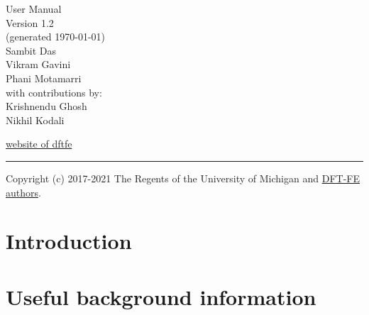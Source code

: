 \documentclass{article}
\begin{document}
{%
\color{dark_grey}
\vspace{1.0em}
\hfill{\Huge \fontfamily{\sfdefault}\selectfont User Manual \\
\raggedleft \huge \fontfamily{\sfdefault}\selectfont Version
1.2 %
\\\large(generated \today)\\
\vspace{1.5em}
{\Large Sambit Das\,\\Vikram Gavini\,\\Phani Motamarri\\}
\vspace{1.0em}
\large
\noindent with contributions by: \\
    {\Large Krishnendu Ghosh\\}
    {\Large Nikhil Kodali\\}
\vspace{1.0em}
}
\null
\vspace{17em}

{\noindent
{\fontfamily{\sfdefault}\selectfont \href{https://sites.google.com/umich.edu/dftfe}{website of dftfe}}
}


{\noindent
\color{dark_grey}
\rule{\textwidth}{2pt}
}

}
Copyright (c) 2017-2021 The Regents of the University of Michigan and \hyperref[sec:authors]{DFT-FE authors}.
\pagebreak
{}


\pagebreak

\tableofcontents

\pagebreak

\section{Introduction}
\label{sec:intro}


\section{Useful background information}
\label{sec:background}

\end{document}
